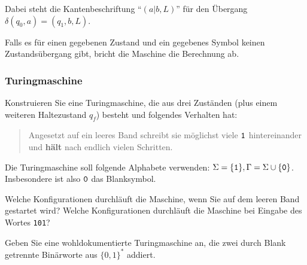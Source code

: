 \documentclass{beamer}
\begin{document}
{{\begin{center}
					\end{center}

					Dabei steht die Kantenbeschriftung ``$(a|b,L)$'' für den Übergang $\delta(q_0,a) =
					(q_1,b,L)$.

					\vspace{2mm}
					Falls es für einen gegebenen Zustand und ein gegebenes
					Symbol keinen Zustandsübergang gibt, bricht die Maschine die Berechnung ab. 
}


\begin{frame}
\frametitle{Turingmaschine}
 \label{sec:busy_beaver}

Konstruieren Sie eine Turingmaschine, die aus drei Zuständen (plus einem
weiteren Haltezustand $q_f$) besteht und folgendes Verhalten hat:
\begin{quote}
  Angesetzt auf ein leeres Band schreibt sie möglichst viele ${\tt 1}$
  hintereinander und \textbf{hält} nach endlich vielen Schritten.
\end{quote}
Die Turingmaschine soll folgende Alphabete verwenden: $\Sigma = \{{\tt 1}\},
\Gamma = \Sigma \cup \{{\tt 0}\}$.  Insbesondere ist also ${\tt 0}$ das
Blanksymbol.

Welche Konfigurationen durchläuft die Maschine, wenn Sie auf dem leeren Band
gestartet wird?  Welche Konfigurationen durchläuft die Maschine bei Eingabe
des Wortes {\tt 101}?
\end{frame}
\begin{frame}
 Geben Sie eine wohldokumentierte Turingmaschine an, die zwei durch Blank
getrennte Binärworte aus $\{0,1\}^*$ addiert.
\end{frame}

}
\end{document}
